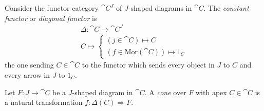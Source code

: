 \documentclass[12pt]{article}
\begin{document}
\begin{definition}
	Consider the functor category $\cat{C}^J$ of $J$-shaped diagrams in $\cat{C}$. The \emph{constant functor} or \emph{diagonal functor} is 
	\begin{gather*}
		\Delta: \cat{C} \to \cat{C}^J \\
		C \mapsto \begin{cases} (j\in\cat{C}) \mapsto C \\ (f\in\text{Mor}(\cat{C}))\mapsto 1_C \end{cases}
	\end{gather*}
	the one sending $C\in\cat{C}$ to the functor which sends every object in $J$ to $C$ and every arrow in $J$ to $1_C$.
\end{definition}

\begin{definition}
	Let $F:J\to \cat{C}$ be a $J$-shaped diagram in $\cat{C}$. A \emph{cone} over $F$ with apex $C\in\cat{C}$ is a natural transformation $f:\Delta(C)\Rightarrow F$.
\end{definition}
\end{document}
